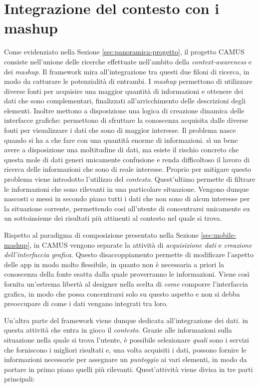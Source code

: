 \section{Integrazione del contesto con i mashup\label{sec:integrazione-contesto-mashup}}

Come evidenziato nella Sezione \ref{sec:panoramica-progetto}, il progetto CAMUS consiste nell'unione delle ricerche effettuate nell'ambito della \emph{context-awareness} e dei \emph{mashup}. Il framework mira all'integrazione tra questi due filoni di ricerca, in modo da catturare le potenzialità di entrambi. I \emph{mashup} permettono di utilizzare diverse fonti per acquisire una maggior quantità di informazioni e ottenere dei dati che sono complementari, finalizzati all'arricchimento delle descrizioni degli elementi. Inoltre mettono a disposizione una logica di creazione dinamica delle interfacce grafiche: permettono di sfruttare la conoscenza acquisita dalle diverse fonti per visualizzare i dati che sono di maggior interesse. Il problema nasce quando si ha a che fare con una quantità enorme di informazioni. \upe sì un bene avere a disposizione una moltitudine di dati, ma esiste il rischio concreto che questa mole di dati generi unicamente confusione e renda difficoltoso il lavoro di ricerca delle informazioni che sono di reale interesse. Proprio per mitigare questo problema viene introdotto l'utilizzo del \emph{contesto}. Quest'ultimo permette di filtrare le informazioni che sono rilevanti in una particolare situazione. Vengono dunque nascosti o messi in secondo piano tutti i dati che non sono di alcun interesse per la situazione corrente, permettendo così all'utente di concentrarsi unicamente su un sottoinsieme dei risultati più attinenti al contesto nel quale si trova.

Rispetto al paradigma di composizione presentato nella Sezione \ref{sec:mobile-mashup}, in CAMUS vengono separate la attività di \emph{acquisizione dati} e \emph{creazione dell'interfaccia grafica}. Questo disaccoppiamento permette di modificare l'aspetto delle app in modo molto flessibile, in quanto non è necessaria a priori la conoscenza della fonte esatta dalla quale proverranno le informazioni. Viene così fornita un'estrema libertà al designer nella scelta di \emph{come} comporre l'interfaccia grafica, in modo che possa concentrarsi solo su questo aspetto e non si debba preoccupare di come i dati vengano integrati tra loro.

Un'altra parte del framework viene dunque dedicata all'integrazione dei dati. \upe in questa attività che entra in gioco il \emph{contesto}. Grazie alle informazioni sulla situazione nella quale si trova l'utente, è possibile selezionare \emph{quali} sono i servizi che forniscono i migliori risultati e, una volta acquisiti i dati, possono fornire le informazioni necessarie per assegnare un \emph{punteggio} ai vari elementi, in modo da portare in primo piano quelli più rilevanti. Quest'attività viene divisa in tre parti principali:

